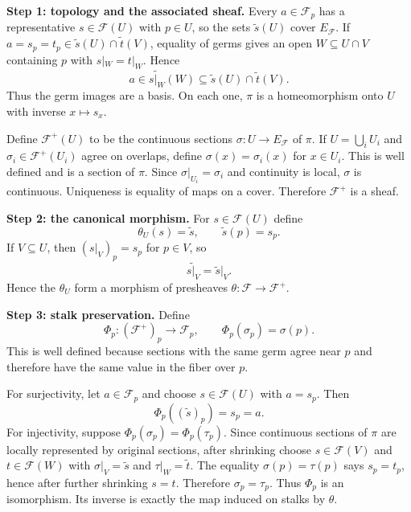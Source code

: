 \ifdefined\FullProblemDossiers
\begin{solution}
\textbf{Step 1: topology and the associated sheaf.}
Every $a\in\mathcal F_p$ has a representative $s\in\mathcal F(U)$ with $p\in U$, so the
sets $\widetilde s(U)$ cover $E_{\mathcal F}$.  If
$a=s_p=t_p\in\widetilde s(U)\cap\widetilde t(V)$, equality of germs gives an open
$W\subseteq U\cap V$ containing $p$ with $s|_W=t|_W$.  Hence
\[
a\in\widetilde{s|_W}(W)
\subseteq
\widetilde s(U)\cap\widetilde t(V).
\]
Thus the germ images are a basis.  On each one, $\pi$ is a homeomorphism onto $U$ with
inverse $x\mapsto s_x$.

Define $\mathcal F^+(U)$ to be the continuous sections $\sigma:U\to E_{\mathcal F}$ of
$\pi$.  If $U=\bigcup_iU_i$ and $\sigma_i\in\mathcal F^+(U_i)$ agree on overlaps, define
$\sigma(x)=\sigma_i(x)$ for $x\in U_i$.  This is well defined and is a section of $\pi$.
Since $\sigma|_{U_i}=\sigma_i$ and continuity is local, $\sigma$ is continuous.  Uniqueness
is equality of maps on a cover.  Therefore $\mathcal F^+$ is a sheaf.

\textbf{Step 2: the canonical morphism.}
For $s\in\mathcal F(U)$ define
\[
\theta_U(s)=\widetilde s,
\qquad
\widetilde s(p)=s_p.
\]
If $V\subseteq U$, then $(s|_V)_p=s_p$ for $p\in V$, so
\[
\widetilde{s|_V}=\widetilde s|_V.
\]
Hence the $\theta_U$ form a morphism of presheaves
$\theta:\mathcal F\to\mathcal F^+$.

\textbf{Step 3: stalk preservation.}
Define
\[
\Phi_p:(\mathcal F^+)_p\to\mathcal F_p,
\qquad
\Phi_p(\sigma_p)=\sigma(p).
\]
This is well defined because sections with the same germ agree near $p$ and therefore have
the same value in the fiber over $p$.

For surjectivity, let $a\in\mathcal F_p$ and choose $s\in\mathcal F(U)$ with $a=s_p$.
Then
\[
\Phi_p((\widetilde s)_p)=s_p=a.
\]
For injectivity, suppose $\Phi_p(\sigma_p)=\Phi_p(\tau_p)$.  Since continuous sections of
$\pi$ are locally represented by original sections, after shrinking choose
$s\in\mathcal F(V)$ and $t\in\mathcal F(W)$ with
$\sigma|_V=\widetilde s$ and $\tau|_W=\widetilde t$.  The equality
$\sigma(p)=\tau(p)$ says $s_p=t_p$, hence after further shrinking $s=t$.  Therefore
$\sigma_p=\tau_p$.  Thus $\Phi_p$ is an isomorphism.  Its inverse is exactly the map induced
on stalks by $\theta$.


\end{solution}

